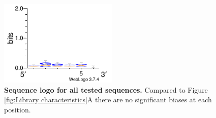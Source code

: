 \begin{figure}[!ht]
   \centering
   \includegraphics[width=0.5\textwidth]{plots/Supplementary/All_logo.pdf}
   \caption{\textbf{Sequence logo for all tested sequences.} Compared to Figure \ref{fig:Library characteristics}A there are no significant biases at each position.}
   \label{fig: All_logo}
\end{figure}

